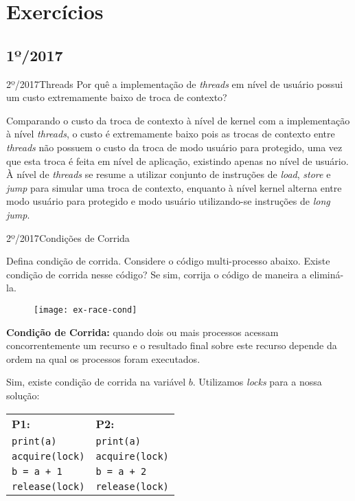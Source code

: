 \chapter{Exercícios}


\section{1º/2017}
\begin{exercicio}
  {2º/2017}{Threads}
  {Por quê a implementação de \textit{threads} em nível de usuário possui um custo extremamente baixo de troca de contexto?}

  Comparando o custo da troca de contexto à nível de kernel com a implementação à nível \textit{threads}, o custo é extremamente baixo pois as trocas de contexto entre \textit{threads} não possuem o custo da troca de modo usuário para protegido, uma vez que esta troca é feita em nível de aplicação, existindo apenas no nível de usuário. À nível de \textit{threads} se resume a utilizar conjunto de instruções de \textit{load}, \textit{store} e \textit{jump} para simular uma troca de contexto, enquanto à nível kernel alterna entre modo usuário para protegido e modo usuário utilizando-se instruções de \textit{long jump}.
\end{exercicio}

\begin{exercicio}
  {2º/2017}{Condições de Corrida}
  {Defina condição de corrida. Considere o código multi-processo abaixo. Existe condição de corrida nesse código? Se sim, corrija o código de maneira a eliminá-la.
  \begin{figure}[H]
    \centering
    \texttt{[image: ex-race-cond]}
  \end{figure}}

  \textbf{Condição de Corrida:} quando dois ou mais processos acessam concorrentemente um recurso e o resultado final sobre este recurso depende da ordem na qual os processos foram executados.

  Sim, existe condição de corrida na variável $b$. Utilizamos \textit{locks} para a nossa solução:

  \begin{table}[H]
    \centering
    \begin{tabular}{l|l}
      \textbf{P1:}            & \textbf{P2:} \\
      \texttt{print(a)}       & \texttt{print(a)} \\
      \texttt{acquire(lock)}  & \texttt{acquire(lock)} \\
      \texttt{b = a + 1}      & \texttt{b = a + 2} \\
      \texttt{release(lock)}  & \texttt{release(lock)}\\
    \end{tabular}
  \end{table}
\end{exercicio}

